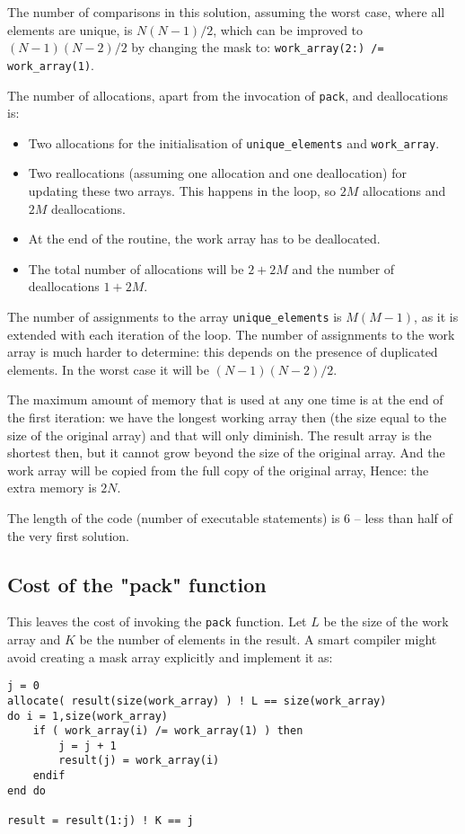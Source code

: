 \documentclass[onecolumn]{article}
\begin{document}
The number of comparisons in this solution, assuming the worst case, where all elements are unique,
is $N(N-1)/2$, which can be improved to $(N-1)(N-2)/2$ by changing the mask to: \verb+work_array(2:) /= work_array(1)+.

The number of allocations, apart from the invocation of \verb+pack+, and deallocations is:
\begin{itemize}
\item
Two allocations for the initialisation of \verb+unique_elements+ and \verb+work_array+.
\item
Two reallocations (assuming one allocation and one deallocation) for updating these two arrays. This
happens in the loop, so $2M$ allocations and $2M$ deallocations.
\item
At the end of the routine, the work array has to be deallocated.
\item
The total number of allocations will be $2 + 2M$ and the number of deallocations $1 + 2M$.
\end{itemize}

The number of assignments to the array \verb+unique_elements+ is $M (M-1)$, as it is extended with each iteration
of the loop. The number of assignments to the work array is much harder to determine: this depends on the
presence of duplicated elements. In the worst case it will be $(N-1)(N-2)/2$.

The maximum amount of memory that is used at any one time is at the end of the first iteration: we have the longest working
array then (the size equal to the size of the original array) and that will only diminish.
The result array is the shortest then, but it cannot grow beyond the size of the original array.
And the work array will be copied from the full copy of the original array,
Hence: the extra memory is $2N$.

The length of the code (number of executable statements) is 6 -- less than half of the very first solution.

\subsection*{Cost of the "pack" function}
This leaves the cost of invoking the \verb+pack+ function. Let $L$ be the size of the work array and $K$ be the number
of elements in the result. A smart compiler might avoid creating a mask array explicitly and implement it as:

\begin{verbatim}
j = 0
allocate( result(size(work_array) ) ! L == size(work_array)
do i = 1,size(work_array)
    if ( work_array(i) /= work_array(1) ) then
        j = j + 1
        result(j) = work_array(i)
    endif
end do

result = result(1:j) ! K == j
\end{verbatim}
\end{document}
